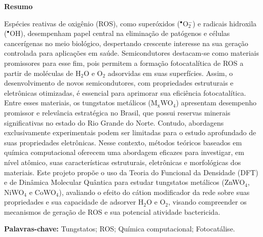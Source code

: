 \ifincluirresumo
\clearpage
\begin{center}
  \fontsize{14}{16}\selectfont\textbf{Resumo}
\end{center}
\begin{text}
    \noindent Espécies reativas de oxigênio (ROS), como superóxidos ($^\bullet$O$_{\text{2}}^{-}$) e radicais hidroxila ($^{\bullet}$OH), desempenham papel central na eliminação de patógenos e células cancerígenas no meio biológico, despertando crescente interesse na sua geração controlada para aplicações em saúde. Semicondutores destacam-se como materiais promissores para esse fim, pois permitem a formação fotocatalítica de ROS a partir de moléculas de H$_{\text{2}}$O e O$_{\text{2}}$ adsorvidas em suas superfícies. Assim, o desenvolvimento de novos semicondutores, com propriedades estruturais e eletrônicas otimizadas, é essencial para aprimorar sua eficiência fotocatalítica. Entre esses materiais, os tungstatos metálicos (M$_{\text{x}}$WO$_{\text{4}}$) apresentam desempenho promissor e relevância estratégica no Brasil, que possui reservas minerais significativas no estado do Rio Grande do Norte. Contudo, abordagens exclusivamente experimentais podem ser limitadas para o estudo aprofundado de suas propriedades eletrônicas. Nesse contexto, métodos teóricos baseados em química computacional oferecem uma abordagem eficazes para investigar, em nível atômico, suas características estruturais, eletrônicas e morfológicas dos materiais. Este projeto propõe o uso da Teoria do Funcional da Densidade (DFT) e de Dinâmica Molecular Quântica para estudar tungstatos metálicos (ZnWO$_{\text{4}}$, NiWO$_{\text{4}}$ e CoWO$_{\text{4}}$), avaliando o efeito do cátion modificador da rede sobre suas propriedades e sua capacidade de adsorver H$_{\text{2}}$O e O$_{\text{2}}$, visando compreender os mecanismos de geração de ROS e sua potencial atividade bactericida.
    
    \vspace{1em}    
    \noindent \textbf{Palavras-chave:} Tungstatos; ROS; Química computacional; Fotocatálise.
\end{text}
\fi

